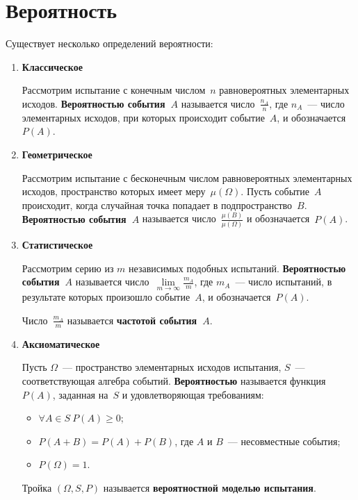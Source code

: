 \section{Вероятность}
 Существует несколько определений вероятности:
\begin{enumerate}
	\item \textbf{Классическое}
	
	Рассмотрим испытание с конечным числом~$n$ равновероятных элементарных исходов.
	\textbf{Вероятностью события~$A$} называется число~$\frac{n_A}n$, где $n_A$~--- число элементарных исходов, при которых происходит событие~$A$, и обозначается~$P(A)$.
	
	\item \textbf{Геометрическое}
	
	Рассмотрим испытание с бесконечным числом равновероятных элементарных исходов, пространство которых имеет меру~$\mu(\Omega)$.
	Пусть событие~$A$ происходит, когда случайная точка попадает в подпространство~$B$.
	\textbf{Вероятностью события~$A$} называется число~$\frac{\mu(B)}{\mu(\Omega)}$ и обозначается~$P(A)$.
	
	\item \textbf{Статистическое}
	
	Рассмотрим серию из $m$ независимых подобных испытаний.
	\textbf{Вероятностью события~$A$} называется число~$\lim\limits_{m \to \infty} \frac{m_A}m$, где $m_A$~--- число испытаний, в результате которых произошло событие~$A$, и обозначается~$P(A)$.
	
	Число~$\frac{m_A}m$ называется \textbf{частотой события~$A$}.
	
	\item \textbf{Аксиоматическое}
	
	Пусть $\Omega$~--- пространство элементарных исходов испытания, $S$~--- соответствующая алгебра событий.
	\textbf{Вероятностью} называется функция~$P(A)$, заданная на~$S$ и удовлетворяющая требованиям:
	\begin{itemize}
		\item $\forall A \in S \ P(A) \geqslant 0$;
		\item $P(A + B) = P(A) + P(B)$, где $A$ и $B$~--- несовместные события;
		\item $P(\Omega) = 1$.
	\end{itemize}
	
	 Тройка $(\Omega, S, P)$ называется \textbf{вероятностной моделью испытания}.
\end{enumerate}

